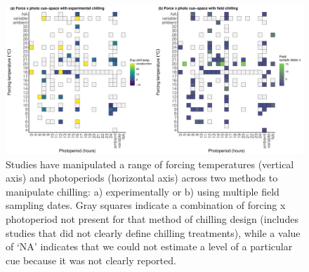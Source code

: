 \documentclass[11pt,letter]{article}
\begin{document}
\clearpage


\clearpage
\begin{figure}[t!]
\centering
\includegraphics[width=1.1\textwidth]{..//..//analyses/limitingcues/figures/heatmapphotoxforcexchill2panel.pdf}
\caption{Studies have manipulated a range of forcing temperatures (vertical axis) and photoperiods (horizontal axis) across two methods to manipulate chilling: a) experimentally or  b) using multiple field sampling dates. Gray squares indicate a combination of forcing x photoperiod not present for that method of chilling design (includes studies that did not clearly define chilling treatments), while a value of `NA' indicates that we could not estimate a level of a particular cue because it was not clearly reported.}
  \label{fig:heatmaps} 
\end{figure}

\clearpage
\end{document}
